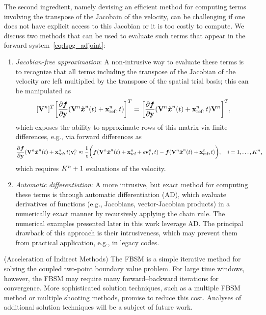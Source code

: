 The second ingredient, namely devising an efficient method for computing terms
involving the transpose of the Jacobain of the velocity,
can be challenging if one
does not have explicit access to this Jacobian or it is too costly to
compute. We discuss two methods that can be used to evaluate such terms
that appear in the forward system~\eqref{eq:lspg_adjoint}:
\begin{enumerate}
\item \textit{Jacobian-free approximation}: A non-intrusive way to evaluate
	these terms is to recognize that all terms including the transpose of the
		Jacobian of the velocity are left multiplied by the transpose of the
		spatial trial basis; this can be manipulated as
$$[\mathbf {V}^{n}]^T \bigg[\frac{\partial \boldsymbol f}{\partial \mathbf{y}}
		(\mathbf {V}^{n} \hat{ \boldsymbol x}^{n}(t) + \mathbf{x}_\text{ref}^{n},t)\bigg]^T = \bigg[  \frac{\partial \boldsymbol f}{\partial
		\mathbf{y}} (\mathbf {V}^{n} \hat{ \boldsymbol x}^{n}(t) + \mathbf{x}_\text{ref}^{n},t) \mathbf {V}^{n} \bigg]^T,$$
		which exposes the ability to approximate rows of this matrix via
		finite differences, e.g., via forward differences as
$$\frac{\partial \boldsymbol f}{\partial \mathbf{y}}(\mathbf {V}^{n} \hat{ \boldsymbol x}^{n}(t) + \mathbf{x}_\text{ref}^{n},t)
		\mathbf{v}_i^n \approx \frac{1}{\epsilon}\bigg(
		\boldsymbol f(\mathbf {V}^{n}\hat{ \boldsymbol x}^{n}(t) + \mathbf{x}_\text{ref}^{n} +
		\epsilon \mathbf{v}_i^n,t) - \boldsymbol f(\mathbf {V}^{n} \hat{ \boldsymbol x}^{n}(t) + \mathbf{x}_\text{ref}^{n},t) \bigg),\quad
		i=1,\ldots,K^{n},$$
which requires $K^{n}+1$ evaluations of the velocity. 

\item \textit{Automatic differentiation}: A more intrusive, but exact
	method for computing these terms is
		through automatic differentiation (AD), which evaluate derivatives of
		functions (e.g., Jacobians, vector-Jacobian products) in a numerically
		exact manner by recursively applying the chain rule. The numerical
		examples presented later in this work leverage AD. The principal drawback
		of this approach is their intrusiveness, which may prevent them from
		practical application, e.g., in legacy codes.
\end{enumerate}

\begin{remark}\label{remark:fbsm}(Acceleration of Indirect Methods)
The FBSM is a simple iterative method for solving the coupled two-point boundary value problem. For large time windows, however, the FBSM may require many 
forward--backward iterations for convergence. More sophisticated solution techniques, such as a multiple FBSM method or multiple shooting methods, promise 
to reduce this cost. Analyses of additional solution techniques will be a subject of future work.
\end{remark}

